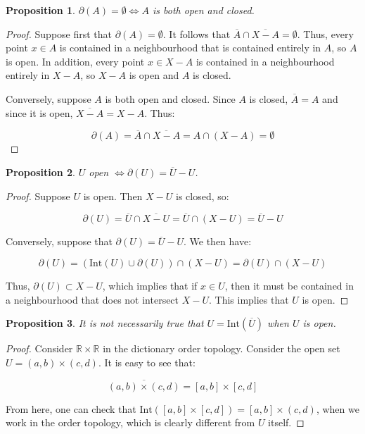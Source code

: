 \documentclass[10pt, oneside]{amsart}
\newtheorem{prop}{Proposition}
\begin{document}
    \begin{prop}
      $\partial(A) = \emptyset \Leftrightarrow A$ is both open and closed.
    \end{prop}

    \begin{proof}
      Suppose first that $\partial(A) = \emptyset$. It follows that $\overline{A} \cap \overline{X - A} = \emptyset$. Thus, every point $x \in A$ is contained in a neighbourhood that is contained entirely in $A$, so $A$ is open. In addition,
      every point $x \in X - A$ is contained in a neighbourhood entirely in $X - A$, so $X - A$ is open and $A$ is closed.
      \newline

      Conversely, suppose $A$ is both open and closed. Since $A$ is closed, $\overline{A} = A$ and since it is open, $\overline{X - A} = X - A$. Thus:

      $$\partial(A) = \overline{A} \cap \overline{X - A} = A \cap (X - A) = \emptyset$$
    \end{proof}

    \begin{prop}
      $U$ open $\Leftrightarrow \partial(U) = \overline{U} - U$.
    \end{prop}

    \begin{proof}
      Suppose $U$ is open. Then $X - U$ is closed, so:

      $$\partial(U) = \overline{U} \cap \overline{X - U} = \overline{U} \cap (X - U) = \overline{U} - U$$

      Conversely, suppose that $\partial(U) = \overline{U} - U$. We then have:

      $$\partial(U) = \left( \text{Int}(U) \cup \partial(U) \right) \cap (X - U) = \partial(U) \cap (X - U)$$

      Thus, $\partial(U) \subset X - U$, which implies that if $x \in U$, then it must be contained in a neighbourhood that does not intersect $X - U$. This implies that $U$ is open.
    \end{proof}

    \begin{prop}
      It is not necessarily true that $U = \text{Int}(\overline{U})$ when $U$ is open.
    \end{prop}

    \begin{proof}
      Consider $\mathbb{R} \times \mathbb{R}$ in the dictionary order topology. Consider the open set $U = (a, b) \times (c, d)$. It is easy to see that:

      $$\overline{(a, b) \times (c, d)} = [a, b] \times [c, d]$$

      From here, one can check that $\text{Int}([a, b] \times [c, d]) = [a, b] \times (c, d)$, when we work in the order topology, which is clearly different from $U$ itself.
    \end{proof}
\end{document}
